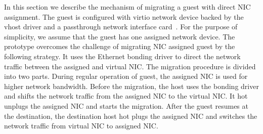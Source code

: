 In this section we describe the mechanism of migrating a guest
with direct NIC assignment. The guest is configured with
virtio network device backed by the vhost driver and a
passthrough network interface card~\cite{zhai:2008}. For the
purpose of simplicity, we assume that the guest has one
assigned network device. The prototype overcomes the challenge
of migrating NIC assigned guest by the following strategy. It
uses the Ethernet bonding driver to direct the network traffic
between the assigned and virtual NIC. The migration procedure
is divided into two parts. During regular operation of guest,
the assigned NIC is used for higher network bandwidth. Before
the migration, the host uses the bonding driver and shifts the
network traffic from the assigned NIC to the virtual NIC. It
hot unplugs the assigned NIC and starts the migration. After
the guest resumes at the destination, the destination host hot
plugs the assigned NIC and switches the network traffic from
virtual NIC to assigned NIC.

%


